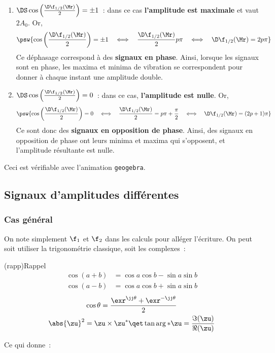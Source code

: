 \documentclass[../../main/main.tex]{subfiles}
\begin{document}
\begin{enumerate}[label=$\triangleright$]
	\item $\DS \cos \left( \frac{\D\f_{1/2}(\Mr)}{2} \right) = \pm 1$~: dans ce cas
	      \textbf{l'amplitude est maximale} et vaut $2A_0$. Or,
	      \[\psw{
			      \cos \left( \frac{\D\f_{1/2}(\Mr)}{2} \right) = \pm 1
			      \quad\Longleftrightarrow\quad
			      \frac{\D\f_{1/2}(\Mr)}{2} p\pi
			      \quad\Longleftrightarrow\quad
			      \D\f_{1/2}(\Mr) = 2p\pi
		      }\]
	      Ce déphasage correspond à des \textbf{signaux en phase}. Ainsi, lorsque
	      les signaux sont en phase, les maxima et minima de vibration se
	      correspondent pour donner à chaque instant une amplitude double.
	\item $\DS \cos \left( \frac{\D\f_{1/2}(\Mr)}{2} \right) = 0$~: dans ce cas,
	      \textbf{l'amplitude est nulle}. Or,
	      \[\psw{
			      \cos \left( \frac{\D\f_{1/2}(\Mr)}{2} \right) = 0
			      \quad\Longleftrightarrow\quad
			      \frac{\D\f_{1/2}(\Mr)}{2} = p\pi + \frac{\pi}{2}
			      \quad\Longleftrightarrow\quad
			      \D\f_{1/2}(\Mr) = (2p+1)\pi
		      }\]
	      Ce sont donc des \textbf{signaux en opposition de phase}. Ainsi, des
	      signaux en opposition de phase ont leurs minima et maxima qui
	      s'opposent, et l'amplitude résultante est nulle.
\end{enumerate}
Ceci est vérifiable avec l'animation \texttt{geogebra}.


\subsection{Signaux d'amplitudes différentes}
\subsubsection{Cas général}

\noindent
On note simplement $\f_1$ et $\f_2$ dans les calculs pour alléger l'écriture.
On peut soit utiliser la trigonométrie classique, soit les complexes~:
\begin{tcb}[sidebyside](rapp){Rappel}
	\vspace*{-15pt}
	\begin{align*}
		\cos(a+b) & = \cos a\cos b - \sin a\sin b \\
		\cos(a-b) & = \cos a\cos b + \sin a\sin b
	\end{align*}
	\tcblower
	\vspace*{-15pt}
	\begin{gather*}
		\cos\theta = \frac{\exr^{\jj\theta}+\exr^{-\jj\theta}}{2}\\
		\abs{\zu}^2 = \zu\times\zu^*
		\qet
		\tan\arg*{\zu} = \frac{\Im(\zu)}{\Re(\zu)}
	\end{gather*}
\end{tcb}
Ce qui donne~:
\end{document}
